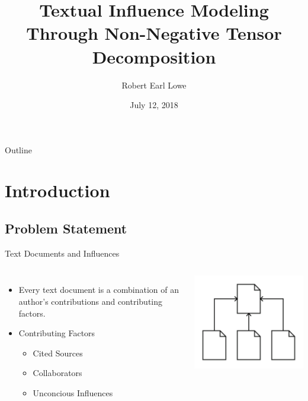 \documentclass[handout]{beamer}
\title[Textual Influence Modeling]{Textual Influence Modeling Through Non-Negative Tensor Decomposition}
\author{Robert Earl Lowe}
\date[]{July 12, 2018}
\begin{document}

\begin{frame}
  \titlepage
\end{frame}

\begin{frame}{Outline}
  \tableofcontents
\end{frame}

\section{Introduction}
\subsection{Problem Statement}
\begin{frame}{Text Documents and Influences}
\begin{columns}
\begin{itemize}[<+->]
  \item Every text document is a combination of an author's contributions and contributing factors.
  \item Contributing Factors
  \begin{itemize}
    \item Cited Sources
    \item Collaborators
    \item Unconcious Influences
  \end{itemize}
\end{itemize}
\includegraphics[width=\textwidth]{images/Citations}
\end{columns}
\end{frame}
\end{document}
